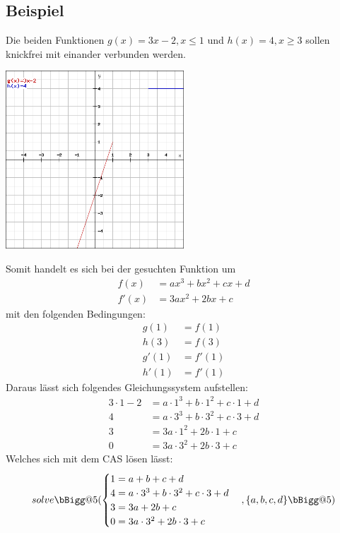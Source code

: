 \documentclass[a4paper,12pt]{article}
\makeatletter
\newcommand{\Vast}{\bBigg@{5}}
\makeatother
\begin{document}
\subsection{Beispiel}
Die beiden Funktionen $g(x) = 3x-2, x \leq 1$ und $h(x) = 4, x \geq 3$ sollen knickfrei mit einander verbunden werden.
\begin{center}
\includegraphics[width=0.5\textwidth]{image1.png}
\end{center}
Somit handelt es sich bei der gesuchten Funktion um
\begin{equation}
\begin{split}
f(x) & = ax^3 + bx^2 + cx + d\\
f'(x) & = 3ax^2 + 2bx + c
\end{split}
\end{equation}
mit den folgenden Bedingungen:
\begin{equation}
\begin{split}
g(1) & = f(1)\\
h(3) & = f(3)\\
g'(1) & = f'(1)\\
h'(1) & = f'(1)
\end{split}
\end{equation}
Daraus lässt sich folgendes Gleichungssystem aufstellen:
\begin{equation}
\begin{split}
3\cdot 1-2 & = a\cdot 1^3 + b\cdot 1^2 + c\cdot 1 + d\\
4 & = a\cdot 3^3 + b\cdot 3^2 + c\cdot 3 + d\\
3 & = 3a\cdot 1^2 + 2b \cdot 1 + c\\
0 & = 3a\cdot 3^2 + 2b\cdot 3 + c
\end{split}
\end{equation}
Welches sich mit dem CAS lösen lässt:
\[
solve \Vast(
\begin{cases}
1 = a + b + c + d\\
4 = a\cdot 3^3 + b\cdot 3^2 + c\cdot 3 + d\\
3 = 3a + 2b  + c\\
0 = 3a\cdot 3^2 + 2b\cdot 3 + c
\end{cases}
,\{a,b,c,d\}\Vast)
\]
\end{document}
